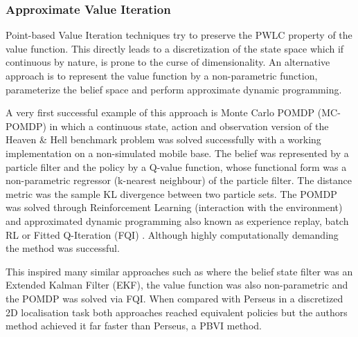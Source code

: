 
\subsubsection{Approximate Value Iteration}

Point-based Value Iteration techniques try to preserve the PWLC property of the value function. This directly 
leads to a discretization of the state space which if continuous by nature, is prone to the curse of dimensionality.
An alternative approach is to represent the value function by a non-parametric function, parameterize the belief space and perform approximate 
dynamic programming.  


A very first successful example of this approach is Monte Carlo POMDP (MC-POMDP) \cite{MC-POMDP} in which a continuous 
state, action and observation version of the Heaven \& Hell benchmark problem was solved successfully with a working 
implementation on a non-simulated mobile base.  
The belief was represented by a particle filter and the policy by a Q-value function, whose functional form was 
a non-parametric regressor (k-nearest neighbour) of the particle filter. The distance metric was the sample KL divergence
between two particle sets. The POMDP was solved through Reinforcement Learning (interaction with the environment) and 
approximated dynamic programming also known as experience replay, batch RL or Fitted Q-Iteration (FQI) \cite{Tree_batch_2005}. 
Although highly computationally demanding the method was successful. 

This inspired many similar approaches such as \cite{mc_update_ppomdps} where the belief state filter was an 
Extended Kalman Filter (EKF), the value function was also non-parametric and the POMDP was solved via FQI. 
When compared with Perseus in a discretized 2D localisation task both approaches reached equivalent 
policies but the authors method achieved it far faster than Perseus, a PBVI method. 

